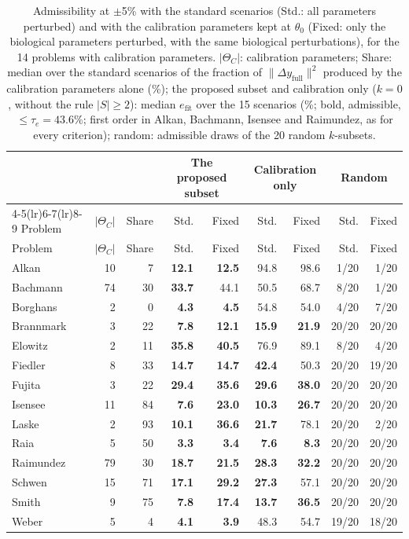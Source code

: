 \begin{longtable}{@{}lrrrrrrrr@{}}
\caption{Admissibility at $\pm$5\% with the standard scenarios (Std.: all parameters perturbed) and with the calibration parameters kept at $\theta_0$ (Fixed: only the biological parameters perturbed, with the same biological perturbations), for the 14 problems with calibration parameters. $|\Theta_C|$: calibration parameters; Share: median over the standard scenarios of the fraction of $\|\Delta y_{\mathrm{full}}\|^2$ produced by the calibration parameters alone (\%); the proposed subset and calibration only ($k=0$, without the rule $|S|\ge2$): median $e_{\mathrm{fit}}$ over the 15 scenarios (\%; bold, admissible, $\le\tau_e=43.6\%$; first order in Alkan, Bachmann, Isensee and Raimundez, as for every criterion); random: admissible draws of the 20 random $k$-subsets.}\label{tab:calfixed}\\
\toprule
 & & & \multicolumn{2}{c}{The proposed subset} & \multicolumn{2}{c}{Calibration only} & \multicolumn{2}{c}{Random} \\
\cmidrule(lr){4-5}\cmidrule(lr){6-7}\cmidrule(lr){8-9}
Problem & $|\Theta_C|$ & Share & Std. & Fixed & Std. & Fixed & Std. & Fixed \\
\midrule
\endfirsthead
\toprule
Problem & $|\Theta_C|$ & Share & Std. & Fixed & Std. & Fixed & Std. & Fixed \\
\midrule
\endhead
Alkan & 10 & 7 & \textbf{12.1} & \textbf{12.5} & 94.8 & 98.6 & 1/20 & 1/20 \\
Bachmann & 74 & 30 & \textbf{33.7} & 44.1 & 50.5 & 68.7 & 8/20 & 1/20 \\
Borghans & 2 & 0 & \textbf{4.3} & \textbf{4.5} & 54.8 & 54.0 & 4/20 & 7/20 \\
Brannmark & 3 & 22 & \textbf{7.8} & \textbf{12.1} & \textbf{15.9} & \textbf{21.9} & 20/20 & 20/20 \\
Elowitz & 2 & 11 & \textbf{35.8} & \textbf{40.5} & 76.9 & 89.1 & 8/20 & 4/20 \\
Fiedler & 8 & 33 & \textbf{14.7} & \textbf{14.7} & \textbf{42.4} & 50.3 & 20/20 & 19/20 \\
Fujita & 3 & 22 & \textbf{29.4} & \textbf{35.6} & \textbf{29.6} & \textbf{38.0} & 20/20 & 20/20 \\
Isensee & 11 & 84 & \textbf{7.6} & \textbf{23.0} & \textbf{10.3} & \textbf{26.7} & 20/20 & 20/20 \\
Laske & 2 & 93 & \textbf{10.1} & \textbf{36.6} & \textbf{21.7} & 78.1 & 20/20 & 2/20 \\
Raia & 5 & 50 & \textbf{3.3} & \textbf{3.4} & \textbf{7.6} & \textbf{8.3} & 20/20 & 20/20 \\
Raimundez & 79 & 30 & \textbf{18.7} & \textbf{21.5} & \textbf{28.3} & \textbf{32.2} & 20/20 & 20/20 \\
Schwen & 15 & 71 & \textbf{17.1} & \textbf{29.2} & \textbf{27.3} & 57.1 & 20/20 & 20/20 \\
Smith & 9 & 75 & \textbf{7.8} & \textbf{17.4} & \textbf{13.7} & \textbf{36.5} & 20/20 & 20/20 \\
Weber & 5 & 4 & \textbf{4.1} & \textbf{3.9} & 48.3 & 54.7 & 19/20 & 18/20 \\
\bottomrule
\end{longtable}

